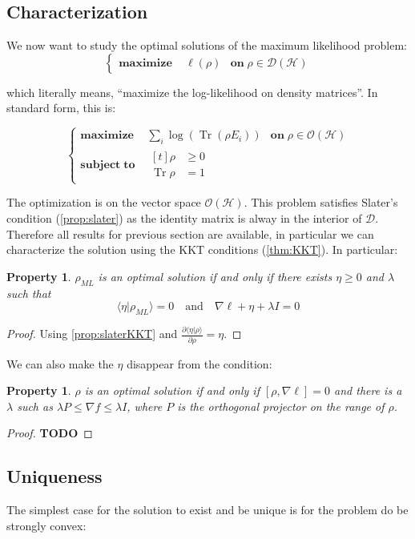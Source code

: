 \documentclass[10pt]{report}
\theoremstyle{plain}
\newtheorem{prop}[thm]{Property}
\theoremstyle{definition}
\theoremstyle{remark}
\newcommand{\TODO}{\textbf{TODO}}
\newcommand{\braket}[2]{\langle#1|#2\rangle}
\newcommand{\dpar}[2]{\frac{\partial{#1}}{\partial{#2}}}
\renewcommand{\geq}{\geqslant}
\DeclareMathOperator{\Tr}{Tr}
\newcommand{\ml}{_{M\!L}}
\newcommand{\maximf}[2]{\begin{cases}
    \mathbf{maximize}\,\quad #1& \mathbf{on}\; #2
  \end{cases}}
\newcommand{\maxima}[3]{\begin{cases}
    \mathbf{maximize}\,\quad #1& \mathbf{on}\; #2\\
    \mathbf{subject\;to}\quad \begin{aligned}[t]#3\end{aligned}
  \end{cases}}
\begin{document}
\subsection{Characterization}

We now want to study the optimal solutions of the maximum likelihood problem:
\[\maximf{\ell(\rho)}{\rho \in \mathcal{D}(\mathcal{H})} \]

which literally means, ``maximize the log-likelihood on density matrices''. In
standard form, this is:

\[\maxima{\displaystyle\sum_i \log(\Tr(\rho E_i))}{\rho \in \mathcal{O}(\mathcal{H})}
  {\rho &\geq 0\\\Tr \rho &= 1}
\]

The optimization is on the vector space $\mathcal{O}(\mathcal{H})$. This problem
satisfies Slater's condition (\ref{prop:slater}) as the identity matrix is alway
in the interior of $\mathcal{D}$. Therefore all results for previous section are
available, in particular we can characterize the solution using the KKT
conditions (\ref{thm:KKT}). In particular:

\begin{prop}
  $\rho\ml$ is an optimal solution if and only if there
exists $\eta \ge 0$ and $\lambda$ such that
\[\braket \eta {\rho\ml} = 0 \quad \text{and} \quad \nabla \ell + \eta +
  \lambda I = 0\]
\end{prop}

\begin{proof}
  Using \cref{prop:slaterKKT} and $\displaystyle\dpar{\braket \eta \rho}\rho = \eta$.
\end{proof}


We can also make the $\eta$ disappear from the condition:
\begin{prop}
  $\rho$ is an optimal solution if and only if $[\rho, \nabla \ell] = 0$ and
  there is a $\lambda$ such as $\lambda P \le \nabla f \le \lambda I$, where $P$
  is the orthogonal projector on the range of $\rho$.
\end{prop}

\begin{proof}
  \TODO{}
\end{proof}

\subsection{Uniqueness}\label{ssec:uniq}

The simplest case for the solution to exist and be unique is for the problem do
be strongly convex:
\end{document}
